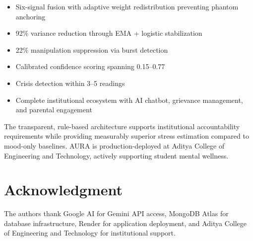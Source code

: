 \documentclass[journal]{IEEEtran}
\begin{document}
\begin{itemize}
    \item Six-signal fusion with adaptive weight redistribution preventing phantom anchoring
    \item 92\% variance reduction through EMA + logistic stabilization
    \item 22\% manipulation suppression via burst detection
    \item Calibrated confidence scoring spanning 0.15--0.77
    \item Crisis detection within 3--5 readings
    \item Complete institutional ecosystem with AI chatbot, grievance management, and parental engagement
\end{itemize}

The transparent, rule-based architecture supports institutional accountability requirements while providing measurably superior stress estimation compared to mood-only baselines. AURA is production-deployed at Aditya College of Engineering and Technology, actively supporting student mental wellness.

\section*{Acknowledgment}

The authors thank Google AI for Gemini API access, MongoDB Atlas for database infrastructure, Render for application deployment, and Aditya College of Engineering and Technology for institutional support.
\end{document}
